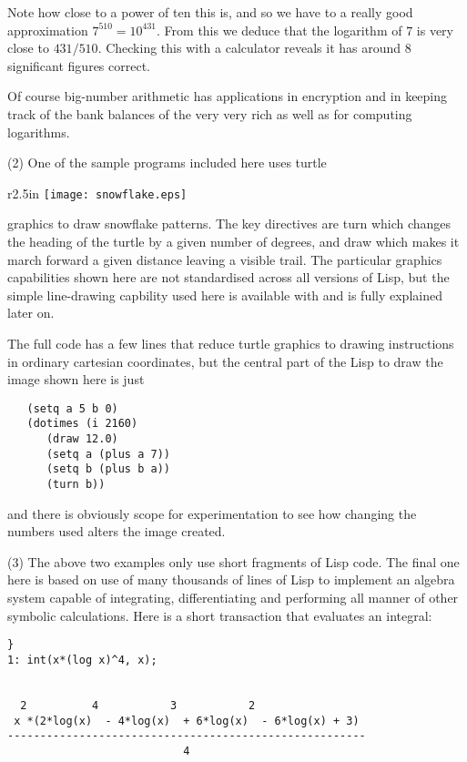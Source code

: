 Note how close to a power of ten this is, and so we have to a really
good approximation $7^{510} = 10^{431}$. From this we deduce that the
logarithm of $7$ is very close to $431/510$. Checking this with a calculator
reveals it has around 8 significant figures correct.

Of course big-number arithmetic has applications in encryption and
in keeping track of the bank balances of the very very rich as well as
for computing logarithms.

(2) One of the sample programs included here uses turtle
\begin{wrapfigure}{r}{2.5in}
{\centering
\texttt{[image: snowflake.eps]}}
\caption{A snowflake pattern}
\end{wrapfigure} graphics to draw snowflake patterns. The
key directives are {\tx turn} which changes the heading of the turtle
by a given number of degrees, and {\tx draw} which makes it march forward
a given distance leaving a visible trail. The particular graphics capabilities
shown here are not standardised across all versions of Lisp, but the
simple line-drawing capbility used here is available with \vsl{} and is
fully explained later on.

The full code has a few lines that reduce turtle graphics to
drawing instructions in ordinary cartesian coordinates, but the central part
of the Lisp to draw the image shown here is just
{\small\begin{verbatim}
   (setq a 5 b 0)
   (dotimes (i 2160)
      (draw 12.0)
      (setq a (plus a 7))
      (setq b (plus b a))
      (turn b))
\end{verbatim}}
\noindent and there is obviously scope for experimentation to see how changing the
numbers used alters the image created.

(3) The above two examples only use short fragments of Lisp code. The
final one here is based on use of many thousands of lines of Lisp to
implement an algebra system capable of integrating, differentiating and
performing all manner of other symbolic calculations. Here is a short
transaction that evaluates an integral:
{\small\begin{verbatim}}
1: int(x*(log x)^4, x);


  2          4           3           2
 x *(2*log(x)  - 4*log(x)  + 6*log(x)  - 6*log(x) + 3)
-------------------------------------------------------
                           4
\end{verbatim}}
\setlength{\oddsidemargin}{0cm}
\setlength{\evensidemargin}{0cm}

